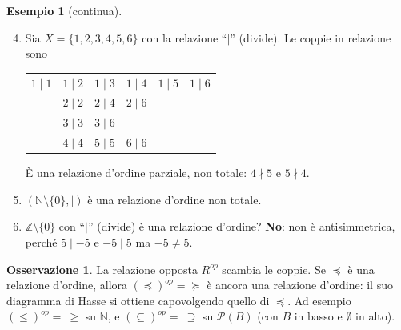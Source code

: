 \documentclass[11pt,a4paper]{article}
\theoremstyle{definition}
\newtheorem*{esempio}{Esempio}
\newtheorem*{osservazione}{Osservazione}
\begin{document}
\begin{esempio}[continua]
\leavevmode
\begin{enumerate}
    \setcounter{enumi}{3}
    \item Sia $X = \{1, 2, 3, 4, 5, 6\}$ con la relazione ``$\mid$''
          (divide). Le coppie in relazione sono
          \begin{center}
          \begin{tabular}{llllll}
          $1 \mid 1$ & $1 \mid 2$ & $1 \mid 3$ & $1 \mid 4$ & $1 \mid 5$ &
          $1 \mid 6$ \\
                     & $2 \mid 2$ & $2 \mid 4$ & $2 \mid 6$ \\
                     & $3 \mid 3$ & $3 \mid 6$ \\
                     & $4 \mid 4$ & $5 \mid 5$ & $6 \mid 6$
          \end{tabular}
          \end{center}
          È una relazione d'ordine parziale, non totale: $4 \nmid 5$ e
          $5 \nmid 4$.

\begin{center}
\end{center}

    \item $(\mathbb{N} \setminus \{0\}, \mid)$ è una relazione d'ordine non
          totale.

    \item $\mathbb{Z} \setminus \{0\}$ con ``$\mid$'' (divide) è una
          relazione d'ordine? \textbf{No}: non è antisimmetrica, perché
          $5 \mid -5$ e $-5 \mid 5$ ma $-5 \neq 5$.
\end{enumerate}
\end{esempio}

\begin{osservazione}
La relazione opposta $R^{op}$ scambia le coppie. Se $\preceq$ è una
relazione d'ordine, allora $(\preceq)^{op} = \succeq$ è ancora una relazione
d'ordine: il suo diagramma di Hasse si ottiene capovolgendo quello di
$\preceq$. Ad esempio $(\leq)^{op} = \ \geq$ su $\mathbb{N}$, e
$(\subseteq)^{op} = \ \supseteq$ su $\mathcal{P}(B)$ (con $B$ in basso e
$\emptyset$ in alto).
\end{osservazione}
\end{document}
